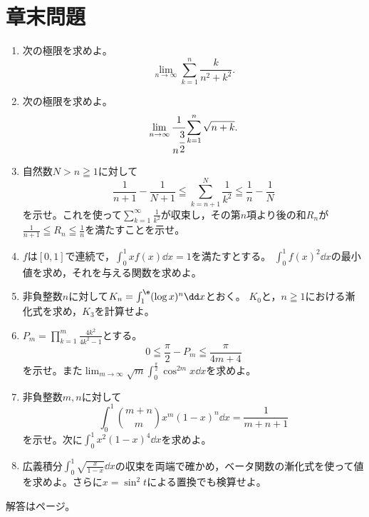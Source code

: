 \section*{章末問題}
\begin{enumerate}[label=\textbf{\thechapter.\arabic*},leftmargin=*]
 \item\label{問:区分求積分子が添字}
 次の極限を求めよ。
 \[
  \lim_{n\to\infty}\sum_{k=1}^{n}\frac{k}{n^2+k^2}.
 \]
 \item\label{問:区分求積根号}
 次の極限を求めよ。
 \[
  \lim_{n\to\infty}\cfrac1{n^{\cfrac32}}
      \sum_{k=1}^{n}\sqrt{n+k}.
 \]
 \item\label{問:逆平方和の残り}
 自然数$N>n\geqq1$に対して
 \[
  \frac1{n+1}-\frac1{N+1}
  \leqq\sum_{k=n+1}^{N}\frac1{k^2}
  \leqq\frac1n-\frac1N
 \]
 を示せ。これを使って$\sum_{k=1}^{\infty}\frac1{k^2}$が収束し，その第$n$項より後の和$R_n$が
 $\frac1{n+1}\leqq R_n\leqq\frac1n$を満たすことを示せ。
 \item\label{問:積分制約と二乗}
 $f$は$[0,1]$で連続で，$\int_0^1xf(x)\dd x=1$を満たすとする。
 $\int_0^1f(x)^2\dd x$の最小値を求め，それを与える関数を求めよ。
 \item\label{問:対数の積分漸化式}
 非負整数$n$に対して$K_n=\int_1^{\e}(\log x)^n\dd x$とおく。
 $K_0$と，$n\geqq1$における漸化式を求め，$K_3$を計算せよ。
 \item\label{問:ウォリス積の誤差}
 $P_m=\prod_{k=1}^{m}\frac{4k^2}{4k^2-1}$とする。
 \[
 0\leqq\frac{\pi}{2}-P_m\leqq\frac{\pi}{4m+4}
 \]
 を示せ。また$\lim_{m\to\infty}\sqrt m\int_0^{\frac{\pi}{2}}\cos^{2m}x\dd x$を求めよ。
 \item\label{問:整数ベータ二項係数}
 非負整数$m,n$に対して
 \[
 \int_0^1\binom{m+n}{m}x^m(1-x)^n\dd x=\frac1{m+n+1}
 \]
 を示せ。次に$\int_0^1x^2(1-x)^4\dd x$を求めよ。
 \item\label{問:半整数ベータ}
 広義積分$\int_0^1\sqrt{\frac{x}{1-x}}\dd x$の収束を両端で確かめ，ベータ関数の漸化式を使って値を求めよ。さらに$x=\sin^2t$による置換でも検算せよ。
\end{enumerate}

\smallskip\noindent 解答は\pageref{解答:第9章}ページ。
